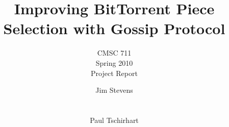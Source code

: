 \documentclass[twocolumn]{sig-alternate}
\begin{document}
\title{Improving BitTorrent Piece Selection with Gossip Protocol}

\subtitle{CMSC 711 \\ Spring 2010 \\ Project Report}

\author{ 
\alignauthor
Jim Stevens\\
	\\
	\\
\alignauthor
Paul Tschirhart\\
	\\
}

\maketitle














\end{document}
